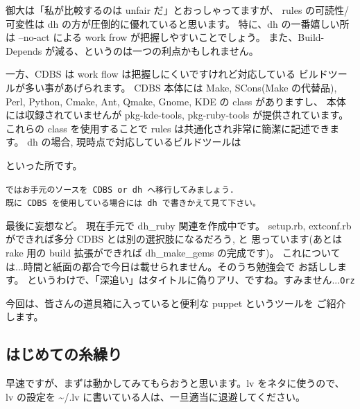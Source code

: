 \documentclass[mingoth,a4paper]{jsarticle}
\begin{document}
御大は「私が比較するのは unfair だ」とおっしゃってますが、
rules の可読性/可変性は dh の方が圧倒的に優れていると思います。
特に、dh の一番嬉しい所は
--no-act による work frow が把握しやすいことでしょう。
また、Build-Depends が減る、というのは一つの利点かもしれません。

一方、CDBS は work flow は把握しにくいですけれど対応している
ビルドツールが多い事があげられます。
CDBS 本体には Make, SCons(Make の代替品), 
Perl, Python, Cmake, Ant,  Qmake, Gnome, KDE の class がありますし、
本体には収録されていませんが pkg-kde-tools, pkg-ruby-tools が提供されています。
これらの class を使用することで rules は共通化され非常に簡潔に記述できます。
dh の場合, 現時点で対応しているビルドツールは
といった所です。


\begin{center}
    {\tt ではお手元のソースを CDBS or dh へ移行してみましょう. \\
    既に CDBS を使用している場合には dh で書きかえて見て下さい。}
\end{center}

最後に妄想など。
%
現在手元で dh\_ruby 関連を作成中です。
setup.rb, extconf.rb ができれば多分 CDBS とは別の選択肢になるだろう, と
思っています(あとは rake 用の build 拡張ができれば dh\_make\_gems の完成です)。
これについては...時間と紙面の都合で今日は載せられません。そのうち勉強会で
お話しします。
というわけで、「深追い」はタイトルに偽りアリ、ですね。すみません...{\tt Orz}


今回は、皆さんの道具箱に入っていると便利な puppet というツールを
ご紹介します。

\subsection{はじめての糸繰り}

早速ですが、まずは動かしてみてもらおうと思います。lv をネタに使うので、
lv の設定を \textasciitilde /.lv に書いている人は、一旦適当に退避してください。
\end{document}
